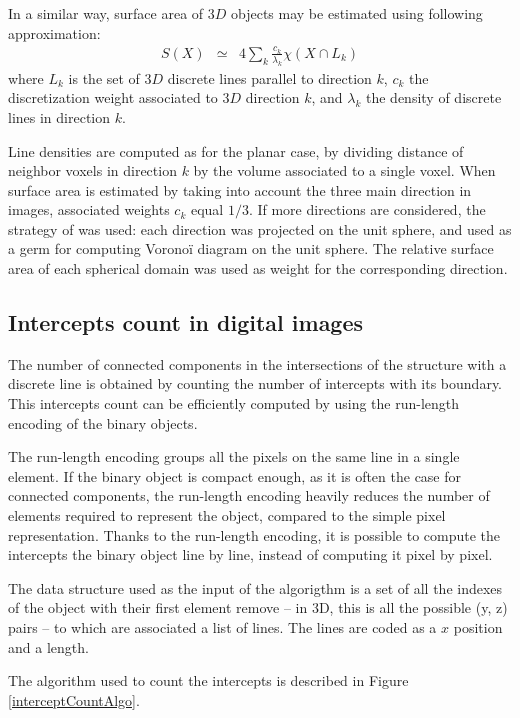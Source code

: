 \documentclass{InsightArticle}
\begin{document}
In a similar way, surface area of $3D$ objects may be estimated using following approximation:
\begin{eqnarray}
S(X) & \simeq & 4\sum_{k}\frac{c_{k}}{\lambda_{k}}\chi \left( X \cap L_{k} \right)
\end{eqnarray}
where $L_k$ is the set of $3D$ discrete lines parallel to direction $k$, 
$c_k$ the discretization weight associated to $3D$ direction $k$, 
and $\lambda_k$ the density of discrete lines in direction $k$.

Line densities are computed as for the planar case, by dividing distance of neighbor
voxels in direction $k$ by the volume associated to a single voxel.
When surface area is estimated by taking into account the three main direction in images, 
associated weights $c_k$ equal $1/3$. If more directions are considered, the strategy of
\cite{Ohser2000} was used: each direction was projected on the unit sphere, 
and used as a germ for computing Voronoï diagram on the unit sphere. 
The relative surface area of each spherical domain was used as weight for the
corresponding direction.

\subsection{Intercepts count in digital images}

The number of connected components in the intersections of the structure with a discrete line
is obtained by counting the number of intercepts with its boundary.
This intercepts count can be efficiently computed by using the run-length
encoding of the binary objects.

The run-length encoding groups all the pixels on the same line in a single element. If the binary object is compact enough, as it is often the case for connected components, the run-length encoding heavily reduces the number of elements required to represent the object, compared to the simple pixel representation. Thanks to the run-length encoding, it is possible to compute the intercepts the binary object line by line, instead of computing it pixel by pixel.

The data structure used as the input of the algorigthm is a set of all the indexes of the object with their first element remove -- in 3D, this is all the possible (y, z) pairs -- to which are associated a list of lines. The lines are coded as a $x$ position and a length.

The algorithm used to count the intercepts is described in Figure \ref{interceptCountAlgo}.
\end{document}
